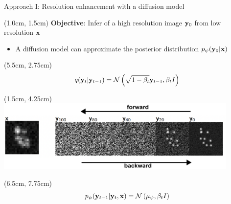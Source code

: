 \documentclass{beamer}					%
\begin{document}
\begin{frame}{Approach I: Resolution enhancement with a diffusion model}

\begin{textblock*}{13cm}(1.0cm, 1.5cm)
\textbf{Objective}: Infer of a high resolution image $\bold{y}_0$ from low resolution $\bold{x}$
\begin{itemize}
\item A diffusion model can approximate the posterior distribution  $p_{\psi}(\bold{y}_0\lvert \bold{x})$
\end{itemize}
\end{textblock*}

\begin{textblock*}{2cm}(5.5cm, 2.75cm)
\begin{equation*}
q(\bold{y}_{t}|\bold{y}_{t-1}) = \mathcal{N}\left(\sqrt{1-\beta_{t}}\bold{y}_{t-1},\beta_t I\right)
\end{equation*}
\end{textblock*}

\begin{textblock*}{12cm}(1.5cm, 4.25cm)
\includegraphics[width=12cm]{../../ddpm/ddpm/media/ForwardBackward.png}
\end{textblock*}

\begin{textblock*}{2cm}(6.5cm, 7.75cm)
\begin{equation*}
p_{\psi}(\bold{y}_{t-1}|\bold{y}_{t},\bold{x}) = \mathcal{N}\left(\mu_{\psi},\beta_{t}I\right)
\end{equation*}

\end{textblock*}

\end{frame}
\end{document}
